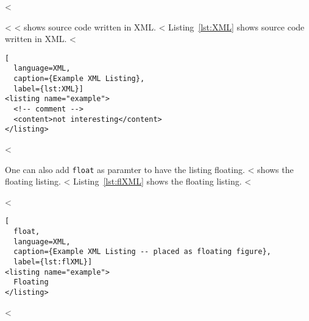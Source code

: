 <%

<%
<%
 shows source code written in XML.
<%
Listing~\ref{lst:XML} shows source code written in XML.
<%

\begin{lstlisting}[
  language=XML,
  caption={Example XML Listing},
  label={lst:XML}]
<listing name="example">
  <!-- comment -->
  <content>not interesting</content>
</listing>
\end{lstlisting}
<%

One can also add \verb+float+ as paramter to have the listing floating.
<%
 shows the floating listing.
<%
Listing~\ref{lst:flXML} shows the floating listing.
<%

<%
\begin{lstlisting}[
  float,
  language=XML,
  caption={Example XML Listing -- placed as floating figure},
  label={lst:flXML}]
<listing name="example">
  Floating
</listing>
\end{lstlisting}
<%
